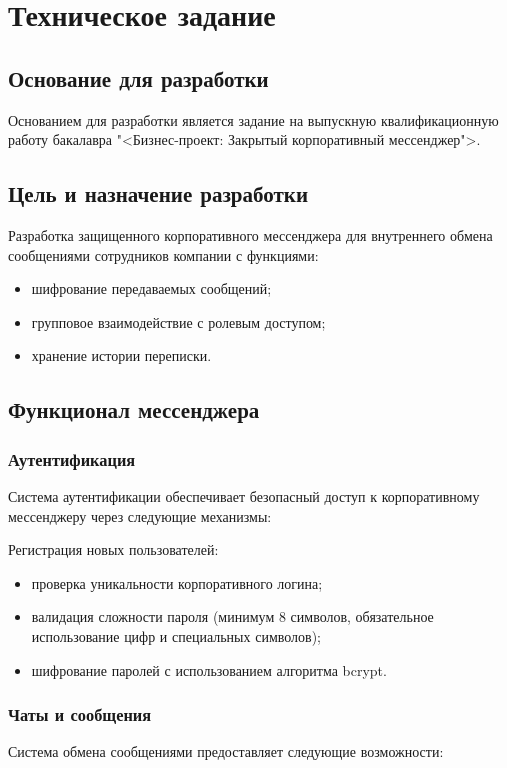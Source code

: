 \section{Техническое задание}
\subsection{Основание для разработки}

Основанием для разработки является задание на выпускную квалификационную работу бакалавра "<Бизнес-проект: Закрытый корпоративный мессенджер">.

\subsection{Цель и назначение разработки}

Разработка защищенного корпоративного мессенджера для внутреннего обмена сообщениями сотрудников компании с функциями:
\begin{itemize}
	\item шифрование передаваемых сообщений;
	\item групповое взаимодействие с ролевым доступом;
	\item хранение истории переписки.
\end{itemize}

	
\subsection{Функционал мессенджера}

\subsubsection{Аутентификация}
Система аутентификации обеспечивает безопасный доступ к корпоративному мессенджеру через следующие механизмы:

Регистрация новых пользователей:

	\begin{itemize}
		\item проверка уникальности корпоративного логина;
		\item валидация сложности пароля (минимум 8 символов, обязательное использование цифр и специальных символов);
		\item шифрование паролей с использованием алгоритма bcrypt.
	\end{itemize}

\subsubsection{Чаты и сообщения}
Система обмена сообщениями предоставляет следующие возможности:

